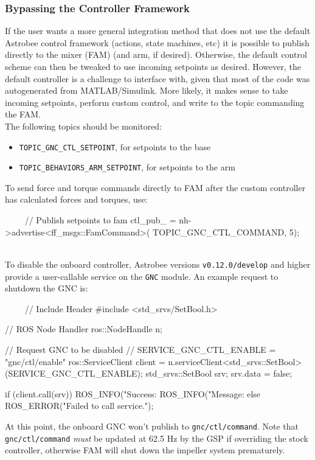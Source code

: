 \documentclass{article}
\begin{document}
\subsubsection{Bypassing the Controller Framework}

If the user wants a more general integration method that does not use the default Astrobee control framework (actions, state machines, etc) it is possible to publish directly to the mixer (FAM) (and arm, if desired). Otherwise, the default control scheme can then be tweaked to use incoming setpoints as desired. However, the default controller is a challenge to interface with, given that most of the code was autogenerated from MATLAB/Simulink. More likely, it makes sense to take incoming setpoints, perform custom control, and write to the topic commanding the FAM.\\

The following topics should be monitored:
\begin{itemize}
	\item \texttt{TOPIC\_GNC\_CTL\_SETPOINT}, for setpoints to the base
	\item \texttt{TOPIC\_BEHAVIORS\_ARM\_SETPOINT}, for setpoints to the arm
\end{itemize}

\indent To send force and torque commands directly to FAM after the custom controller has calculated forces and torques, use:
\begin{markdown}
~~~~
//  Publish setpoints to fam
ctl_pub_ = nh->advertise<ff_msgs::FamCommand>(
TOPIC_GNC_CTL_COMMAND, 5);
~~~~
\end{markdown}

To disable the onboard controller, Astrobee versions \texttt{v0.12.0/develop} and higher provide a user-callable service 
on the \texttt{GNC} module. An example request to shutdown the GNC is:
\begin{markdown}
~~~~
// Include Header 
#include <std_srvs/SetBool.h>

// ROS Node Handler
ros::NodeHandle n;

// Request GNC to be disabled
// SERVICE_GNC_CTL_ENABLE = "gnc/ctl/enable" 
ros::ServiceClient client = 
   n.serviceClient<std_srvs::SetBool>(SERVICE_GNC_CTL_ENABLE);
std_srvs::SetBool srv;
srv.data = false;

if (client.call(srv))
  {
    ROS_INFO("Success: %
    ROS_INFO("Message: %
  }
  else
  {
    ROS_ERROR("Failed to call service.");
  }
~~~~
\end{markdown}
At this point, the onboard GNC won't publish to \texttt{gnc/ctl/command}. Note that \texttt{gnc/ctl/command} \textit{must} be updated at 62.5 Hz by the GSP if overriding the stock controller, otherwise FAM will shut down the impeller system prematurely. 
\end{document}
